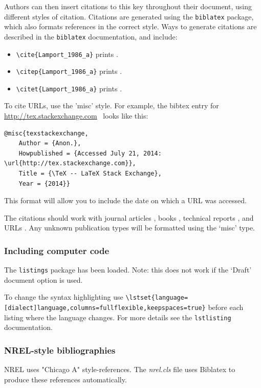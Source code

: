 Authors can then insert citations to this key throughout their document, using different styles of citation. Citations are generated using the \texttt{biblatex} package, which also formats references in the correct style.  Ways to generate citations are described in the \texttt{biblatex} documentation, and include:
\begin{itemize}
\item \verb+\cite{Lamport_1986_a}+ prints \cite{Lamport_1986_a}.
\item \verb+\citep{Lamport_1986_a}+ prints \citep{Lamport_1986_a}.
\item \verb+\citet{Lamport_1986_a}+ prints \citet{Lamport_1986_a}.
\end{itemize}

To cite URLs, use the 'misc' style. For example, the bibtex entry for \href{http://tex.stackexchange.com}{http://tex.stackexchange.com}\ \cite{texstackexchange} looks like this:

\begin{lstlisting}
@misc{texstackexchange,
	Author = {Anon.},
	Howpublished = {Accessed July 21, 2014: \url{http://tex.stackexchange.com}},
	Title = {\TeX -- LaTeX Stack Exchange},
	Year = {2014}}
\end{lstlisting}

This format will allow you to include the date on which a URL was accessed.

The citations should work with journal articles \citep{Clifton_2013_a}, books \citep{Knuth_1984_a, Lamport_1986_a, chicago}, technical reports \citep{TechReportTest}, and URLs \citep{texstackexchange}. Any unknown publication types will be formatted using the `misc' type.

\subsubsection{Including computer code}
The \texttt{listings} package has been loaded. Note: this does not work if the `Draft' document option is used.

To change the syntax highlighting use \verb+\lstset{language=[dialect]language,columns=fullflexible,keepspaces=true}+ before each listing where the language changes. For more details see the \texttt{lstlisting} documentation.

\subsubsection{NREL-style bibliographies}
NREL uses "Chicago A" style-references. The \emph{nrel.cls} file uses Biblatex to produce these references automatically. 

